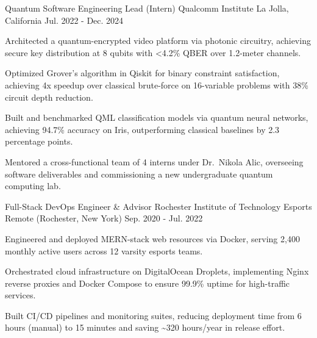 

\begin{cventries}

  \cventry
    {Quantum Software Engineering Lead (Intern)}
    {Qualcomm Institute}
    {La Jolla, California}
    {Jul. 2022 - Dec. 2024}
    {
      \begin{cvitems}
        \item {Architected a quantum-encrypted video platform via photonic circuitry, achieving secure key distribution at 8 qubits with <4.2\% QBER over 1.2-meter channels.}
        \item {Optimized Grover's algorithm in Qiskit for binary constraint satisfaction, achieving 4x speedup over classical brute-force on 16-variable problems with 38\% circuit depth reduction.}
        \item {Built and benchmarked QML classification models via quantum neural networks, achieving 94.7\% accuracy on Iris, outperforming classical baselines by 2.3 percentage points.}
        \item {Mentored a cross-functional team of 4 interns under Dr.\ Nikola Alic, overseeing software deliverables and commissioning a new undergraduate quantum computing lab.}
      \end{cvitems}
    }

  \cventry
    {Full-Stack DevOps Engineer \& Advisor}
    {Rochester Institute of Technology Esports}
    {Remote (Rochester, New York)}
    {Sep. 2020 - Jul. 2022}
    {
      \begin{cvitems}
        \item {Engineered and deployed MERN-stack web resources via Docker, serving 2{,}400 monthly active users across 12 varsity esports teams.}
        \item {Orchestrated cloud infrastructure on DigitalOcean Droplets, implementing Nginx reverse proxies and Docker Compose to ensure 99.9\% uptime for high-traffic services.}
        \item {Built CI/CD pipelines and monitoring suites, reducing deployment time from 6 hours (manual) to 15 minutes and saving \textasciitilde320 hours/year in release effort.}
      \end{cvitems}
    }

\end{cventries}
